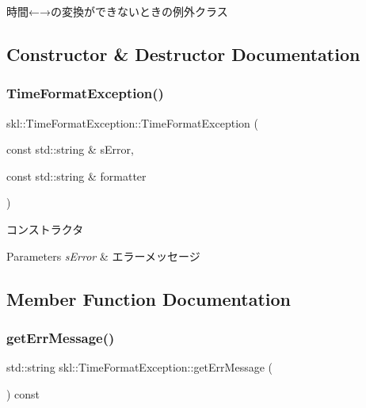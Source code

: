 時間←→の変換ができないときの例外クラス 

\subsection{Constructor \& Destructor Documentation}
\hypertarget{classskl_1_1_time_format_exception_ae2d980f18722c3b6e209f0abd36a427f}{}\label{classskl_1_1_time_format_exception_ae2d980f18722c3b6e209f0abd36a427f} 
\subsubsection{\texorpdfstring{Time\+Format\+Exception()}{TimeFormatException()}}
{\footnotesize\ttfamily skl\+::\+Time\+Format\+Exception\+::\+Time\+Format\+Exception (\begin{DoxyParamCaption}\item[{const std\+::string \&}]{s\+Error,  }\item[{const std\+::string \&}]{formatter }\end{DoxyParamCaption})\hspace{0.3cm}{\ttfamily [explicit]}}



コンストラクタ 


\begin{DoxyParams}{Parameters}
{\em s\+Error} & エラーメッセージ \\
\hline
\end{DoxyParams}


\subsection{Member Function Documentation}
\hypertarget{classskl_1_1_time_format_exception_af94af572753b869b0056ea1aae3ae7b1}{}\label{classskl_1_1_time_format_exception_af94af572753b869b0056ea1aae3ae7b1} 
\subsubsection{\texorpdfstring{get\+Err\+Message()}{getErrMessage()}}
{\footnotesize\ttfamily std\+::string skl\+::\+Time\+Format\+Exception\+::get\+Err\+Message (\begin{DoxyParamCaption}{ }\end{DoxyParamCaption}) const}



